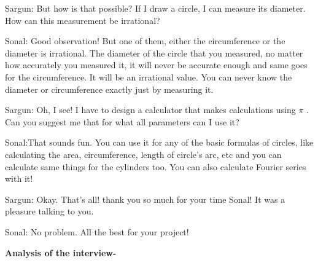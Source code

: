 \documentclass[12pt]{article}
\begin{document}
\begin{justify}
Sargun: But how is that possible? If I draw a circle, I can measure its diameter. How can this measurement be irrational?
\end{justify}\par

\begin{justify}
Sonal: Good observation! But one of them, either the circumference or the diameter is irrational. The diameter of the circle that you measured, no matter how accurately you measured it, it will never be accurate enough and same goes for the circumference. It will be an irrational value. You can never know the diameter or circumference exactly just by measuring it.
\end{justify}\par

\begin{justify}
Sargun: Oh, I see! I have to design a calculator that makes calculations using $ \pi $ . Can you suggest me that for what all parameters can I use it?
\end{justify}\par

\begin{justify}
Sonal:\tab That sounds fun. You can use it for any of the basic formulas of circles, like calculating the area, circumference, length of circle’s arc, etc and you can calculate same things for the cylinders too. You can also calculate Fourier series with it!
\end{justify}\par

\begin{justify}
Sargun: Okay. That’s all! thank you so much for your time Sonal! It was a pleasure talking to you.
\end{justify}\par

\begin{justify}
Sonal: No problem. All the best for your project!
\end{justify}\par


\vspace{\baselineskip}
\begin{justify}
\textbf{Analysis of the interview-}
\end{justify}\par
\end{document}
